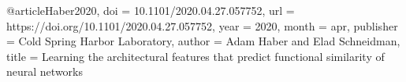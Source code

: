 @article{Haber2020,
  doi = {10.1101/2020.04.27.057752},
  url = {https://doi.org/10.1101/2020.04.27.057752},
  year = {2020},
  month = apr,
  publisher = {Cold Spring Harbor Laboratory},
  author = {Adam Haber and Elad Schneidman},
  title = {Learning the architectural features that predict functional similarity of neural networks}
}